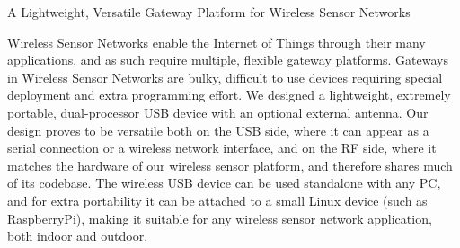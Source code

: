 A Lightweight, Versatile Gateway Platform for Wireless Sensor Networks

Wireless Sensor Networks enable the Internet of Things through their many applications, and as such require multiple, flexible gateway platforms. Gateways in Wireless Sensor Networks are bulky, difficult to use devices requiring special deployment and extra programming effort. We designed a lightweight, extremely portable, dual-processor USB device with an optional external antenna. Our design proves to be versatile both on the USB side, where it can appear as a serial connection or a wireless network interface, and on the RF side, where it matches the hardware of our wireless sensor platform, and therefore shares much of its codebase. The wireless USB device can be used standalone with any PC, and for extra portability it can be attached to a small Linux device (such as RaspberryPi), making it suitable for any wireless sensor network application, both indoor and outdoor.
